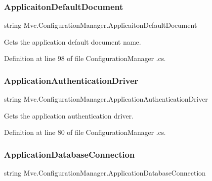 \subsubsection{\texorpdfstring{Applicaiton\+Default\+Document}{ApplicaitonDefaultDocument}}
{\footnotesize\ttfamily string Mvc.\+Configuration\+Manager.\+Applicaiton\+Default\+Document\hspace{0.3cm}{\ttfamily [get]}}



Gets the application default document name. 



Definition at line 98 of file Configuration\+Manager .\+cs.

\mbox{\label{class_mvc_1_1_configuration_manager_a0cb7f0a9c20b0f5f67e9bdac41496172}} 
\subsubsection{\texorpdfstring{Application\+Authentication\+Driver}{ApplicationAuthenticationDriver}}
{\footnotesize\ttfamily string Mvc.\+Configuration\+Manager.\+Application\+Authentication\+Driver\hspace{0.3cm}{\ttfamily [get]}}



Gets the application authentication driver. 



Definition at line 80 of file Configuration\+Manager .\+cs.

\mbox{\label{class_mvc_1_1_configuration_manager_a318a7ee1d3119f9bc651adfbd512e627}} 
\subsubsection{\texorpdfstring{Application\+Database\+Connection}{ApplicationDatabaseConnection}}
{\footnotesize\ttfamily string Mvc.\+Configuration\+Manager.\+Application\+Database\+Connection\hspace{0.3cm}{\ttfamily [get]}}



